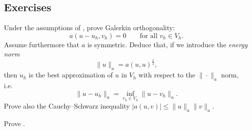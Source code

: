 \subsection*{Exercises}
\begin{exercises}
    \ex \label{ex:cea orthogonality}
    Under the assumptions of , prove Galerkin orthogonality:
    \[
        a(u-u_h,v_h)=0 \qquad \text{for all } v_h\in V_h.
    \]
    Assume furthermore that $a$ is symmetric. Deduce that, if we introduce the \emph{energy norm}
    \begin{equation}
        \label{eq:energy norm}
        \|u\|_a = a(u, u)^{\frac 1 2},
    \end{equation}
    then $u_h$ is the best approximation of $u$ in $V_h$ with respect to the $\|\cdot\|_a$ norm, i.e.
    \begin{equation}
        \|u - u_h\|_a = \inf_{v_h \in V_h} \|u - v_h\|_a.
    \end{equation}
    Prove also the Cauchy--Schwarz inequality $|a(u,v)| \le \|u\|_a \|v\|_a$.

    \ex Prove .
\end{exercises}